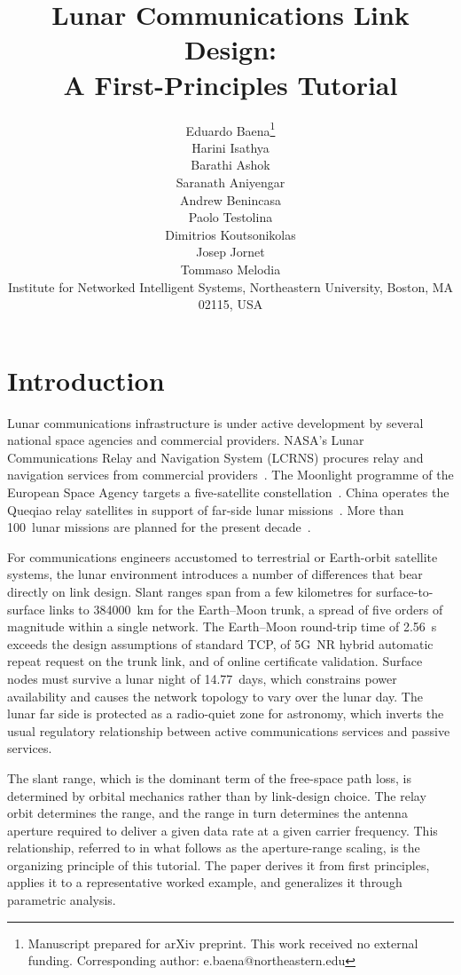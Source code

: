 \documentclass[11pt,a4paper]{article}
\title{Lunar Communications Link Design: \\ A First-Principles Tutorial}
\author{%
  Eduardo Baena\thanks{Manuscript prepared for arXiv preprint. This work received no external funding. Corresponding author: e.baena@northeastern.edu} \\
  Harini Isathya \\
  Barathi Ashok \\
  Saranath Aniyengar \\
  Andrew Benincasa \\
  Paolo Testolina \\
  Dimitrios Koutsonikolas \\
  Josep Jornet \\
  Tommaso Melodia \\
  \small Institute for Networked Intelligent Systems, Northeastern University, Boston, MA 02115, USA
}
\date{}
\begin{document}
\maketitle


\section{Introduction}
Lunar communications infrastructure is under active development by several national space agencies and commercial providers. NASA's Lunar Communications Relay and Navigation System (LCRNS) procures relay and navigation services from commercial providers~\cite{lcrns_esper2025,nasa_im_contract}. The Moonlight programme of the European Space Agency targets a five-satellite constellation~\cite{esa_moonlight_overview,esa_moonlight_csc}. China operates the Queqiao relay satellites in support of far-side lunar missions~\cite{chen_ce4_relay,cnsa_queqiao2}. More than 100~lunar missions are planned for the present decade~\cite{pwc_lunar_market}.

For communications engineers accustomed to terrestrial or Earth-orbit satellite systems, the lunar environment introduces a number of differences that bear directly on link design. Slant ranges span from a few kilometres for surface-to-surface links to \SI{384000}{km} for the Earth--Moon trunk, a spread of five orders of magnitude within a single network. The Earth--Moon round-trip time of \SI{2.56}{\second} exceeds the design assumptions of standard TCP, of 5G~NR hybrid automatic repeat request on the trunk link, and of online certificate validation. Surface nodes must survive a lunar night of \SI{14.77}{days}, which constrains power availability and causes the network topology to vary over the lunar day. The lunar far side is protected as a radio-quiet zone for astronomy, which inverts the usual regulatory relationship between active communications services and passive services.

The slant range, which is the dominant term of the free-space path loss, is determined by orbital mechanics rather than by link-design choice. The relay orbit determines the range, and the range in turn determines the antenna aperture required to deliver a given data rate at a given carrier frequency. This relationship, referred to in what follows as the aperture-range scaling, is the organizing principle of this tutorial. The paper derives it from first principles, applies it to a representative worked example, and generalizes it through parametric analysis.
\end{document}
